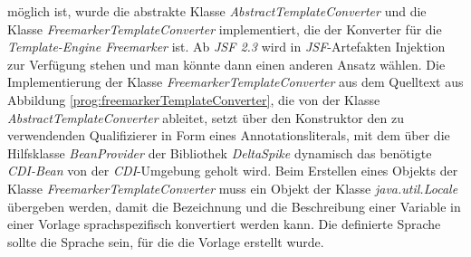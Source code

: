 möglich ist, wurde die abstrakte Klasse \emph{AbstractTemplateConverter} und die Klasse \emph{FreemarkerTemplateConverter} implementiert, die der Konverter für die \emph{Template-Engine Freemarker} ist. Ab \emph{JSF 2.3} wird in \emph{JSF}-Artefakten Injektion zur Verfügung stehen und man könnte dann einen anderen Ansatz wählen. Die Implementierung der Klasse \emph{FreemarkerTemplateConverter} aus dem Quelltext aus Abbildung \ref{prog:freemarkerTemplateConverter}, die von der Klasse \emph{AbstractTemplateConverter} ableitet, setzt über den Konstruktor den zu verwendenden Qualifizierer in Form eines Annotationsliterals, mit dem über die Hilfsklasse \emph{BeanProvider} der Bibliothek \emph{DeltaSpike} dynamisch das benötigte \emph{CDI-Bean} von der \emph{CDI}-Umgebung geholt wird. Beim Erstellen eines Objekts der Klasse \emph{FreemarkerTemplateConverter} muss ein Objekt der Klasse \emph{java.util.Locale} übergeben werden, damit die Bezeichnung und die Beschreibung einer Variable in einer Vorlage sprachspezifisch konvertiert werden kann. Die definierte Sprache sollte die Sprache sein, für die die Vorlage erstellt wurde.
\newpage


